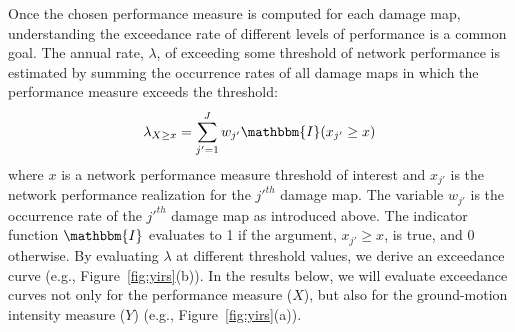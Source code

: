 Once the chosen performance measure is computed for each damage map, understanding the exceedance rate of different levels of performance is a common goal. The annual rate, $\lambda$, of exceeding some threshold of network performance is estimated by summing the occurrence rates of all damage maps in which the performance measure exceeds the threshold: 
\begin{equation}
\lambda_{X \geq x} = \sum_{j'=1}^{J} w_{j'} \mathbbm{I}(x_{j'}\geq x)
\label{eq:exceedance}
\end{equation}
where $x$ is a network performance measure threshold of interest and $x_{j'}$ is the network performance realization for the $j'^{th}$ damage map. The variable $w_{j'}$ is the occurrence rate of the $j'^{th}$ damage map as introduced above.
The indicator function $\mathbbm{I}$  evaluates to 1 if the argument, $x_{j'} \geq x$, is true, and 0 otherwise. By evaluating $\lambda$ at different threshold values, we derive an exceedance curve (e.g., Figure~\ref{fig:yirs}{\color{red}(b)}). In the results below, we will evaluate exceedance curves not only for the performance measure ($X$), but also for the ground-motion intensity measure ($Y$) (e.g., Figure~\ref{fig:yirs}{\color{red}(a)}). 

